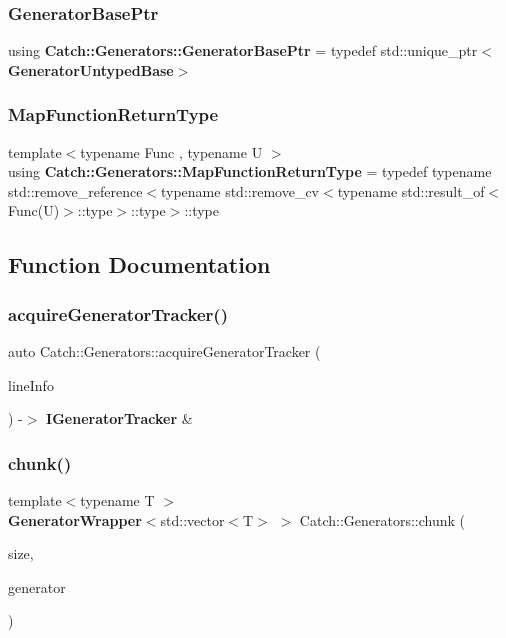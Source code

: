 \subsubsection{GeneratorBasePtr}
{\footnotesize\ttfamily using \textbf{ Catch\+::\+Generators\+::\+Generator\+Base\+Ptr} = typedef std\+::unique\+\_\+ptr$<$\textbf{ Generator\+Untyped\+Base}$>$}

\mbox{\label{namespace_catch_1_1_generators_aa509b9b4dd25a6d6309ce8c7da441c02}} 
\subsubsection{MapFunctionReturnType}
{\footnotesize\ttfamily template$<$typename Func , typename U $>$ \\
using \textbf{ Catch\+::\+Generators\+::\+Map\+Function\+Return\+Type} = typedef typename std\+::remove\+\_\+reference$<$typename std\+::remove\+\_\+cv$<$typename std\+::result\+\_\+of$<$Func(U)$>$\+::type$>$\+::type$>$\+::type}



\subsection{Function Documentation}
\mbox{\label{namespace_catch_1_1_generators_a36413e3baec520d89d21bea23b7bea5b}} 
\subsubsection{acquireGeneratorTracker()}
{\footnotesize\ttfamily auto Catch\+::\+Generators\+::acquire\+Generator\+Tracker (\begin{DoxyParamCaption}\item[{\textbf{ Source\+Line\+Info} const \&}]{line\+Info }\end{DoxyParamCaption}) -\/$>$  \textbf{ I\+Generator\+Tracker} \&}

\mbox{\label{namespace_catch_1_1_generators_a0ac5eeee0354973c318f62d0937a7981}} 
\subsubsection{chunk()}
{\footnotesize\ttfamily template$<$typename T $>$ \\
\textbf{ Generator\+Wrapper}$<$std\+::vector$<$T$>$ $>$ Catch\+::\+Generators\+::chunk (\begin{DoxyParamCaption}\item[{size\+\_\+t}]{size,  }\item[{\textbf{ Generator\+Wrapper}$<$ T $>$ \&\&}]{generator }\end{DoxyParamCaption})}

